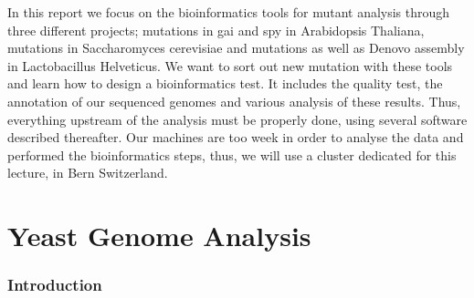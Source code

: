 \documentclass[10pt,a4paper]{article}
\begin{document}
In this report we focus on the bioinformatics tools for mutant analysis through three different projects; mutations in gai and spy in Arabidopsis Thaliana, mutations in Saccharomyces cerevisiae and mutations as well as Denovo assembly in Lactobacillus Helveticus. We want to sort out new mutation with these tools and learn how to design a bioinformatics test. It includes the quality test, the annotation of our sequenced genomes and various analysis of these results. Thus, everything upstream of the analysis must be properly done, using several software described thereafter. Our machines are too week in order to analyse the data and performed the bioinformatics steps, thus, we will use a cluster dedicated for this lecture, in Bern Switzerland. 




\newpage
\part*{Yeast Genome Analysis}

\section*{Introduction}


\end{document}
